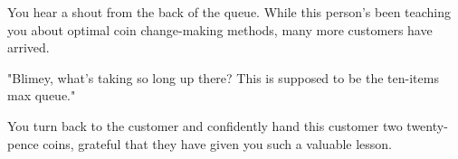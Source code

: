 \documentclass{article}
\begin{document}

You hear a shout from the back of the queue. While this person's been teaching you about optimal coin change-making methods, many more customers have arrived.

"Blimey, what's taking so long up there? This is supposed to be the ten-items max queue."

You turn back to the customer and confidently hand this customer two twenty-pence coins, grateful that they have given you such a valuable lesson.
\end{document}
